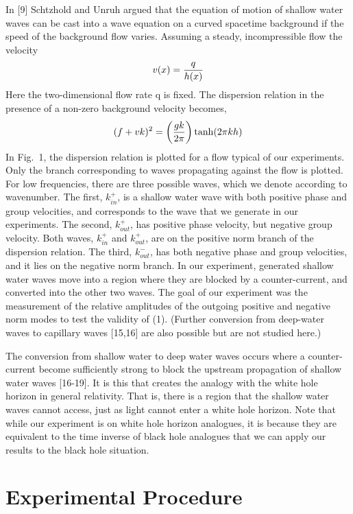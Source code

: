 \documentclass[12pt,aps%
]{revtex4}
\def\bea{\begin{eqnarray}}
\def\eea{\end{eqnarray}}
\begin{document}
In [9] Schtzhold and Unruh argued that the equation of motion of shallow
water waves can be cast into a wave equation on a curved spacetime background
if the speed of the background flow varies. Assuming a steady, incompressible
flow the velocity
\bea
v(x)={q\over h(x)}
\eea
Here the two-dimensional flow rate q is fixed. The dispersion relation in the
presence of a non-zero background velocity becomes,
\bea
(f+vk)^2=\left({gk\over 2\pi}\right) \tanh(2\pi kh)
\eea
In Fig.\ 1, the dispersion relation is plotted for a flow typical of our
experiments. Only the branch corresponding to waves propagating against the
flow is plotted. For low frequencies, there are three possible waves, which we
denote according to wavenumber. The first, $k^+_{in}$,  is a shallow water wave with
both positive phase and group velocities, and corresponds to the wave that we
generate in our experiments. The second, $k^+_{out}$, has positive phase velocity,
but negative group velocity. Both waves, $k^+_{in}$ and $k^+_{out}$, are on the positive
norm branch of the dispersion relation. The third, $k^-_{out}$, has both negative
phase and group velocities, and it lies on the negative norm branch. In our
experiment, generated shallow water waves move into a region where they are
blocked by a counter-current, and converted into the other two waves. The goal
of our experiment was the measurement of the relative amplitudes of the
outgoing positive and negative norm modes to test the validity of (1).
(Further conversion from deep-water waves to capillary waves [15,16] are also
possible but are not studied here.)

	The conversion from shallow water to deep water waves occurs where a
counter-current become sufficiently strong to block the upstream propagation
of shallow water waves [16-19]. It is this that creates the analogy with the
white hole horizon in general relativity. That is, there is a region 
that the shallow water waves cannot access, just as light cannot enter a white
hole horizon. Note that while our experiment is on white hole horizon
analogues, it is because they are equivalent to the time inverse of black hole
analogues that we can apply our results to the black hole situation.

\section{Experimental Procedure}
\end{document}
